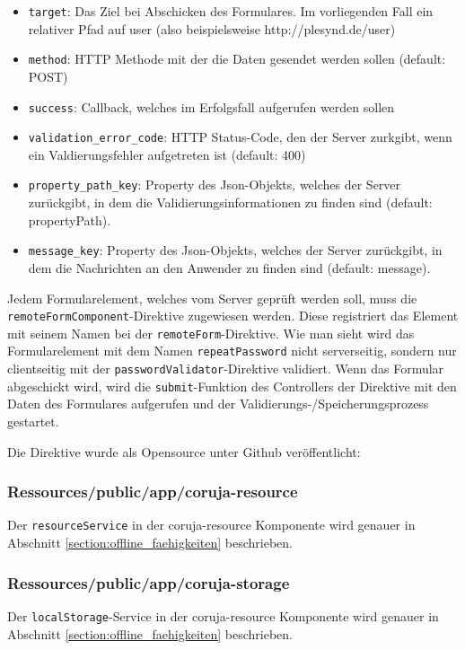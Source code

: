 \begin{itemize}
 \item \texttt{target}: Das Ziel bei Abschicken des Formulares. Im vorliegenden Fall ein relativer Pfad auf user (also beispielsweise http://plesynd.de/user)
 \item \texttt{method}: HTTP Methode mit der die Daten gesendet werden sollen (default: POST)
 \item \texttt{success}: Callback, welches im Erfolgsfall aufgerufen werden sollen
 \item \texttt{validation\_error\_code}: HTTP Status-Code, den der Server zurkgibt, wenn ein Valdierungsfehler aufgetreten ist (default: 400)
 \item \texttt{property\_path\_key}: Property des Json-Objekts, welches der Server zurückgibt, in dem die Validierungsinformationen zu finden sind (default: propertyPath).
 \item \texttt{message\_key}: Property des Json-Objekts, welches der Server zurückgibt, in dem die Nachrichten an den Anwender zu finden sind (default: message).
\end{itemize}
Jedem Formularelement, welches vom Server geprüft werden soll, muss die \texttt{remote\allowbreak Form\allowbreak Component}-Direktive zugewiesen werden. Diese registriert das Element mit seinem Namen bei der \texttt{remote\allowbreak Form}-Direktive. Wie man sieht wird das Formularelement mit dem Namen \texttt{repeatPassword} nicht serverseitig, sondern nur clientseitig mit der \texttt{passwordValidator}-Direktive validiert. Wenn das Formular abgeschickt wird, wird die \texttt{submit}-Funktion des Controllers der Direktive mit den Daten des Formulares aufgerufen und der Validierungs-/Speicherungsprozess gestartet.

Die Direktive wurde als Opensource unter Github veröffentlicht: 

\subsubsection*{Ressources/public/app/coruja-resource}
Der \texttt{resourceService} in der coruja-resource Komponente wird genauer in Abschnitt \ref{section:offline_faehigkeiten} beschrieben.

\subsubsection*{Ressources/public/app/coruja-storage}
Der \texttt{localStorage}-Service in der coruja-resource Komponente wird genauer in Abschnitt \ref{section:offline_faehigkeiten} beschrieben.

